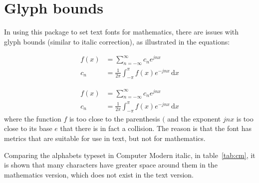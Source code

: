 \documentclass{ltxdockit}
\makeatletter
\def\topbottomrule{\noalign{\ifnum0=`}\fi
          \@aboverulesep=\aboverulesep
          \global\@belowrulesep=\belowrulesep
          \global\@thisruleclass=\@ne
          \@ifnextchar[{\@BTrule}{\@BTrule[\heavyrulewidth]}}
\makeatother
\begin{document}
\section{Glyph bounds}\label{sec:glyphbounds}

In using this package to set text fonts for mathematics, there are issues with glyph bounds (similar to italic correction), as illustrated in the equations:
\begin{example}
\begin{align}
 f(x) &= \sum_{n = -\infty}^\infty c_{n}e^{jnx}            \\
c_{n} &= \frac{1}{2π}\int_{-π}^{π}f(x)e^{-jnx}\,\mathrm dx
\end{align}
\end{example}
\begin{align}
f(x) &= \sum_{n = -\infty}^\infty c_{n}e^{jnx}\label{eq:1}\\
c_{n} &= \frac 1{2π}\int_{-π}^{π}f(x)e^{-jnx}\,\mathrm dx\label{eq:2}
\end{align}
where the function $f$ is too close to the parenthesis $($ and the exponent $jnx$ is too close to its base $e$ that there is in fact a collision. The reason is that the font has metrics that are suitable for use in text, but not for mathematics.

Comparing the alphabets typeset in Computer Modern italic, in table~\ref{tab:cm}, it is shown that many characters have greater space around them in the mathematics version, which does not exist in the text version.

\begin{table}
\caption{Computer Modern Italic in text and mathematics.\label{tab:cm}}
\end{table}
\end{document}
